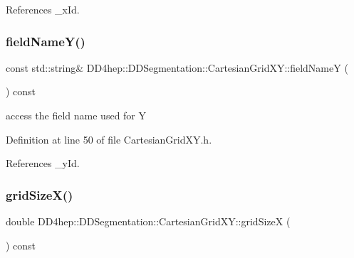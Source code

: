 References \+\_\+x\+Id.

\hypertarget{class_d_d4hep_1_1_d_d_segmentation_1_1_cartesian_grid_x_y_a3ea2a0679682cd34273e3c708daa6ef0}{}\label{class_d_d4hep_1_1_d_d_segmentation_1_1_cartesian_grid_x_y_a3ea2a0679682cd34273e3c708daa6ef0} 
\subsubsection{\texorpdfstring{field\+Name\+Y()}{fieldNameY()}}
{\footnotesize\ttfamily const std\+::string\& D\+D4hep\+::\+D\+D\+Segmentation\+::\+Cartesian\+Grid\+X\+Y\+::field\+NameY (\begin{DoxyParamCaption}{ }\end{DoxyParamCaption}) const\hspace{0.3cm}{\ttfamily [inline]}}



access the field name used for Y 



Definition at line 50 of file Cartesian\+Grid\+X\+Y.\+h.



References \+\_\+y\+Id.

\hypertarget{class_d_d4hep_1_1_d_d_segmentation_1_1_cartesian_grid_x_y_a63c3cc3fdf5ac123dbd270945ca754f6}{}\label{class_d_d4hep_1_1_d_d_segmentation_1_1_cartesian_grid_x_y_a63c3cc3fdf5ac123dbd270945ca754f6} 
\subsubsection{\texorpdfstring{grid\+Size\+X()}{gridSizeX()}}
{\footnotesize\ttfamily double D\+D4hep\+::\+D\+D\+Segmentation\+::\+Cartesian\+Grid\+X\+Y\+::grid\+SizeX (\begin{DoxyParamCaption}{ }\end{DoxyParamCaption}) const\hspace{0.3cm}{\ttfamily [inline]}}



